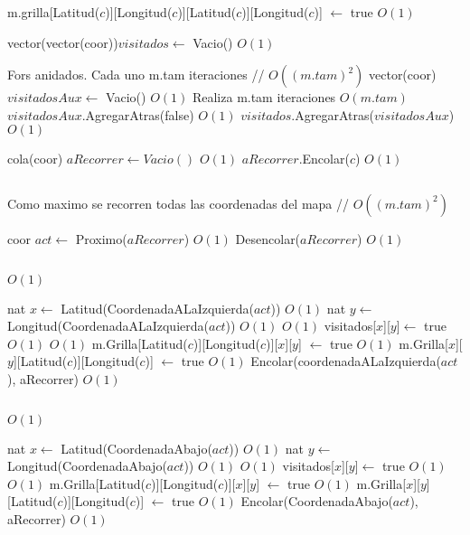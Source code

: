 \begin{Algoritmos}
\begin{algorithmic}[1]
\EndIf

\State m.grilla[Latitud($c$)][Longitud($c$)][Latitud($c$)][Longitud($c$)] $\gets$ true \Comment $O(1)$
\State $ $


\State vector(vector(coor))$visitados \gets$ Vacio() \Comment $O(1)$

	    \Comment Fors anidados. Cada uno m.tam iteraciones // $O((m.tam)^2)$
	\State vector(coor) $visitadosAux \gets$ Vacio()  \Comment $O(1)$	
	      \Comment Realiza m.tam iteraciones $O(m.tam)$
		\State $visitadosAux$.AgregarAtras(false) \Comment $O(1)$
	\EndFor
	\State $visitados$.AgregarAtras($visitadosAux$) \Comment $O(1)$
\EndFor


\State cola(coor) $aRecorrer \gets Vacio() $ \Comment $O(1)$
\State $aRecorrer$.Encolar($c$) \Comment $O(1)$

\State $ $

    \Comment Como maximo se recorren todas las coordenadas del mapa // $O((m.tam)^2)$

\State coor $act \gets$ Proximo($aRecorrer$) \Comment  $O(1)$
\State Desencolar($aRecorrer$) \Comment $O(1)$

\State $ $




      \Comment $O(1)$

\State nat $x \gets$ Latitud(CoordenadaALaIzquierda($act$))   \Comment $O(1)$
\State nat $y \gets$ Longitud(CoordenadaALaIzquierda($act$))  \Comment $O(1)$
    \Comment $O(1)$
\State visitados[$x$][$y$]$ \gets$ true    \Comment $O(1)$
	 	\Comment $O(1)$
		\State m.Grilla[Latitud($c$)][Longitud($c$)][$x$][$y$] $ \gets $ true \Comment $O(1)$
		\State m.Grilla[$x$][$y$][Latitud($c$)][Longitud($c$)] $ \gets $ true \Comment $O(1)$
		\State Encolar(coordenadaALaIzquierda($act$), aRecorrer) \Comment $O(1)$	
	\EndIf
\EndIf
\EndIf

\State $ $

      \Comment $O(1)$

\State nat $x \gets$ Latitud(CoordenadaAbajo($act$))   \Comment $O(1)$
\State nat $y \gets$ Longitud(CoordenadaAbajo($act$))  \Comment $O(1)$
    \Comment $O(1)$
\State visitados[$x$][$y$]$ \gets$ true    \Comment $O(1)$
	 	\Comment $O(1)$
		\State m.Grilla[Latitud($c$)][Longitud($c$)][$x$][$y$] $ \gets $ true \Comment $O(1)$
		\State m.Grilla[$x$][$y$][Latitud($c$)][Longitud($c$)] $ \gets $ true \Comment $O(1)$
		\State Encolar(CoordenadaAbajo($act$), aRecorrer) \Comment $O(1)$	
	\EndIf
\EndIf
\EndIf


\end{algorithmic}
\end{Algoritmos}
